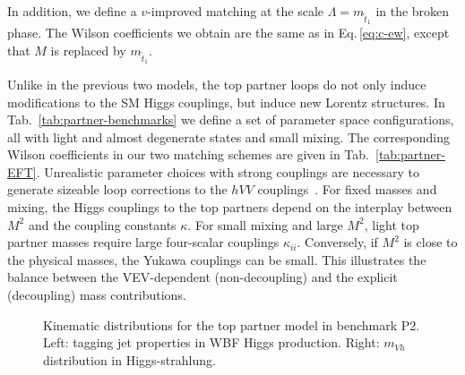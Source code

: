 In addition, we define a $v$-improved matching at the scale $\Lambda =
m_{\tilde{t}_{1}}$ in the broken phase. The Wilson coefficients we
obtain are the same as in Eq.\,\eqref{eq:c-ew}, except that $M$ is
replaced by $m_{\tilde{t}_{1}}$.  

Unlike in the previous two models, the top partner loops do not only
induce modifications to the SM Higgs couplings, but induce new Lorentz
structures.  In Tab.~\ref{tab:partner-benchmarks} we define a set of
parameter space configurations, all with light and almost degenerate
states and small mixing. The corresponding Wilson coefficients in our
two matching schemes are given in Tab.~\ref{tab:partner-EFT}.
Unrealistic parameter choices with strong couplings are necessary to
generate sizeable loop corrections to the $hVV$
couplings~\cite{Hollik:2008xn}. For fixed masses and mixing, the Higgs
couplings to the top partners depend on the interplay between $M^2$
and the coupling constants $\kappa$. For small mixing and large $M^2$,
light top partner masses require large four-scalar couplings
$\kappa_{ii}$.  Conversely, if $M^2$ is close to the physical masses,
the Yukawa couplings can be small.  This illustrates the balance
between the VEV-dependent (non-decoupling) and the explicit
(decoupling) mass contributions.

\begin{figure}[t] \centering
  \caption{Kinematic distributions for the top partner model in
benchmark P2.  Left: tagging jet properties in WBF Higgs production.
Right: $m_{Vh}$ distribution in Higgs-strahlung.}
  \label{fig:validity_partners_distributions}
\end{figure}

